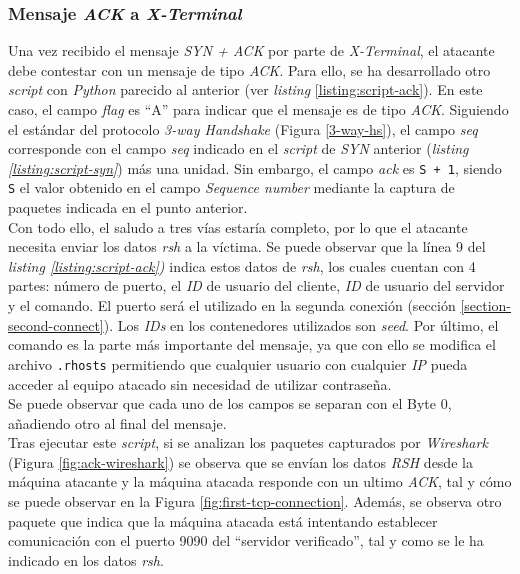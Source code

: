 \documentclass{article}
\begin{document}
\subsubsection{Mensaje \textit{ACK} a \textit{X-Terminal}}
\label{section-ack}
Una vez recibido el mensaje \textit{SYN + ACK} por parte de \textit{X-Terminal}, el atacante debe contestar con un mensaje de tipo \textit{ACK}. Para ello, se ha desarrollado otro \textit{script} con \textit{Python} parecido al anterior (ver \textit{listing} \ref{listing:script-ack}). En este caso, el campo \textit{flag} es ``A'' para indicar que el mensaje es de tipo \textit{ACK}. Siguiendo el estándar del protocolo \textit{3-way Handshake} (Figura \ref{3-way-hs}), el campo \textit{seq} corresponde con el campo \textit{seq} indicado en el \textit{script} de \textit{SYN} anterior (\textit{listing \ref{listing:script-syn}}) más una unidad. Sin embargo, el campo \textit{ack} es \texttt{S + 1}, siendo \texttt{S} el valor obtenido en el campo \textit{Sequence number} mediante la captura de paquetes indicada en el punto anterior.\\
Con todo ello, el saludo a tres vías estaría completo, por lo que el atacante necesita enviar los datos \textit{rsh} a la víctima. Se puede observar que la línea 9 del \textit{listing \ref{listing:script-ack}) } indica estos datos de \textit{rsh}, los cuales cuentan con 4 partes: número de puerto, el \textit{ID} de usuario del cliente, \textit{ID} de usuario del servidor y el comando. El puerto será el utilizado en la segunda conexión (sección \ref{section-second-connect}). Los \textit{IDs} en los contenedores utilizados son \textit{seed}. Por último, el comando es la parte más importante del mensaje, ya que con ello se modifica el archivo \texttt{.rhosts} permitiendo que cualquier usuario con cualquier \textit{IP} pueda acceder al equipo atacado sin necesidad de utilizar contraseña. \\
Se puede observar que cada uno de los campos se separan con el Byte 0, añadiendo otro al final del mensaje.\\
Tras ejecutar este \textit{script}, si se analizan los paquetes capturados por \textit{Wireshark} (Figura \ref{fig:ack-wireshark}) se observa que se envían los datos \textit{RSH} desde la máquina atacante y la máquina atacada responde con un ultimo \textit{ACK}, tal y cómo se puede observar en la Figura \ref{fig:first-tcp-connection}. Además, se observa otro paquete que indica que la máquina atacada está intentando establecer comunicación con el puerto 9090 del ``servidor verificado'', tal y como se le ha indicado en los datos \textit{rsh}.
\end{document}
